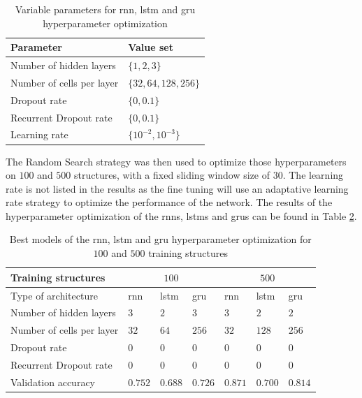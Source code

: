 \documentclass[conference]{IEEEtran}
\begin{document}
\begin{table}[htp]
	\centering
	\caption{Variable parameters for \gls{rnn}, \gls{lstm} and \gls{gru} hyperparameter optimization}
	\label{tab:variable_parameters_rnn_optimization}
	\begin{tabular}{ll}
		\textbf{Parameter} & \textbf{Value set} \\
		\hline
		Number of hidden layers & $ \{1, 2, 3\} $ \\
		Number of cells per layer & $ \{32, 64, 128, 256\} $ \\
		Dropout rate & $ \{0, 0.1\} $ \\
		Recurrent Dropout rate & $ \{0, 0.1\} $ \\
		Learning rate & $ \{10^{-2}, 10^{-3}\} $
	\end{tabular}
\end{table}

The Random Search strategy was then used to optimize those hyperparameters on $ 100 $ and $ 500 $ structures, with a fixed sliding window size of $ 30 $. The learning rate is not listed in the results as the fine tuning will use an adaptative learning rate strategy to optimize the performance of the network. The results of the hyperparameter optimization of the \glspl{rnn}, \glspl{lstm} and \glspl{gru} can be found in Table \ref{tab:results_parameters_rnn_optimization}.

\begin{table}[htp]
	\centering
	\caption{Best models of the \gls{rnn}, \gls{lstm} and \gls{gru} hyperparameter optimization for $ 100 $ and $ 500 $ training structures}
	\label{tab:results_parameters_rnn_optimization}
	\setlength{\tabcolsep}{3pt} %
	\begin{tabular}{p{2.5cm}|lll|lll}
		Training structures & \multicolumn{3}{c}{$ 100 $} & \multicolumn{3}{c}{$ 500 $} \\
		\hline
		Type of architecture & \gls{rnn} & \gls{lstm} & \gls{gru} & \gls{rnn} & \gls{lstm} & \gls{gru}\\
		\hline
		Number of hidden layers & $3$ & $2$ & $3$ & $3$ & $2$ & $2$ \\
		Number of cells per layer & $32$ & $64$ & $256$ & $32$ & $128$ & $256$ \\
		Dropout rate & $0$ & $0$ & $0$ & $0$ & $0$ & $0$ \\
		Recurrent Dropout rate & $0$ & $0$ & $0$& $0$ & $0$ & $0$ \\
		\hline
		Validation accuracy & $0.752$ & $0.688$ & $0.726$ & $0.871$ & $0.700$ & $0.814$
	\end{tabular}
\end{table}
\end{document}
